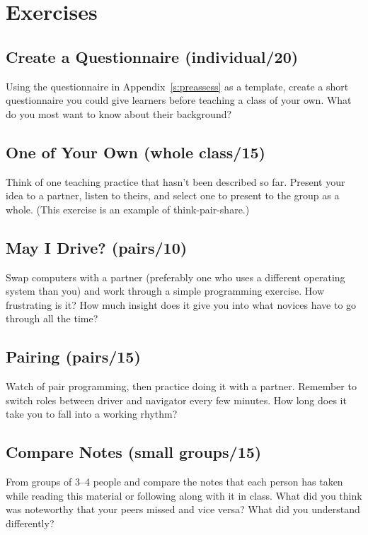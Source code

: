 \section{Exercises}\label{s:classroom-exercises}

\subsection*{Create a Questionnaire (individual/20)}

Using the questionnaire in Appendix~\ref{s:preassess} as a template,
create a short questionnaire you could give learners before teaching a
class of your own. What do you most want to know about their background?

\subsection*{One of Your Own (whole class/15)}

Think of one teaching practice that hasn't been described so far.
Present your idea to a partner, listen to theirs, and select one to
present to the group as a whole. (This exercise is an example of
think-pair-share.)

\subsection*{May I Drive? (pairs/10)}

Swap computers with a partner (preferably one who uses a different
operating system than you) and work through a simple programming
exercise. How frustrating is it? How much insight does it give you into
what novices have to go through all the time?

\subsection*{Pairing (pairs/15)}

Watch  of pair programming, then
practice doing it with a partner. Remember to switch roles between
driver and navigator every few minutes. How long does it take you to
fall into a working rhythm?

\subsection*{Compare Notes (small groups/15)}

From groups of 3--4 people and compare the notes that each person has
taken while reading this material or following along with it in class.
What did you think was noteworthy that your peers missed and vice versa?
What did you understand differently?

